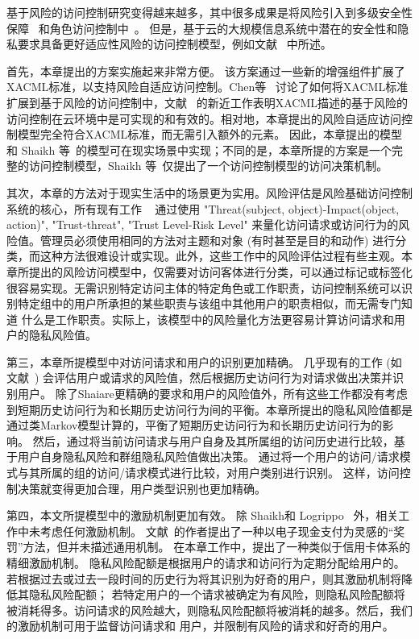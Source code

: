 基于风险的访问控制研究变得越来越多，其中很多成果是将风险引入到多级安全性保障~\cite{cheng2007fuzzy,ni2010risk} 和角色访问控制中~\cite{chen2011risk,choi2015framework}。 但是，基于云的大规模信息系统中潜在的安全性和隐私要求具备更好适应性风险的访问控制模型，例如文献~\cite{wang2011quantified,shaikh2012dynamic,khambhammettu2013framework} 中所述。

首先，本章提出的方案实施起来非常方便。 该方案通过一些新的增强组件扩展了XACML标准，以支持风险自适应访问控制。Chen等~\cite{chen2013xacml} 讨论了如何将XACML标准扩展到基于风险的访问控制中，文献~\cite{santos2014dynamic} 的新近工作表明XACML描述的基于风险的访问控制在云环境中是可实现的和有效的。相对地，本章提出的风险自适应访问控制模型完全符合XACML标准，而无需引入额外的元素。 因此，本章提出的模型和 Shaikh 等~\cite{shaikh2012dynamic}的模型可在现实场景中实现；不同的是，本章所提的方案是一个完整的访问控制模型，Shaikh 等~\cite{shaikh2012dynamic}仅提出了一个访问控制模型的访问决策机制。

其次，本章的方法对于现实生活中的场景更为实用。风险评估是风险基础访问控制系统的核心，所有现有工作 ~\cite{wang2011quantified, shaikh2012dynamic, khambhammettu2013framework} 通过使用 "Threat(subject, object)-Impact(object, action)", "Trust-threat", "Trust Level-Risk Level" 来量化访问请求或访问行为的风险值。管理员必须使用相同的方法对主题和对象 (有时甚至是目的和动作) 进行分类，而这种方法很难设计或实现。此外，这些工作中的风险评估过程有些主观。本章所提出的风险访问模型中，仅需要对访问客体进行分类，可以通过标记或标签化很容易实现。无需识别特定访问主体的特定角色或工作职责，访问控制系统可以识别特定组中的用户所承担的某些职责与该组中其他用户的职责相似，而无需专门知道 什么是工作职责。实际上，该模型中的风险量化方法更容易计算访问请求和用户的隐私风险值。

第三，本章所提模型中对访问请求和用户的识别更加精确。 几乎现有的工作 (如文献~\cite{wang2011quantified,shaikh2012dynamic}) 会评估用户或请求的风险值，然后根据历史访问行为对请求做出决策并识别用户。 除了Shaiare更精确的要求和用户的风险值外，所有这些工作都没有考虑到短期历史访问行为和长期历史访问行为间的平衡。本章所提出的隐私风险值都是通过类Markov模型计算的，平衡了短期历史访问行为和长期历史访问行为的影响。 然后，通过将当前访问请求与用户自身及其所属组的访问历史进行比较，基于用户自身隐私风险和群组隐私风险值做出决策。 通过将一个用户的访问/请求模式与其所属的组的访问/请求模式进行比较，对用户类别进行识别。 这样，访问控制决策就变得更加合理，用户类型识别也更加精确。

第四，本文所提模型中的激励机制更加有效。 除 Shaikh和 Logrippo ~\cite{shaikh2012dynamic}外，相关工作中未考虑任何激励机制。 文献~\cite{shaikh2012dynamic}的作者提出了一种以电子现金支付为灵感的“奖罚”方法，但并未描述通用机制。 在本章工作中，提出了一种类似于信用卡体系的精细激励机制。 隐私风险配额是根据用户的请求和访问行为定期分配给用户的。 若根据过去或过去一段时间的历史行为将其识别为好奇的用户，则其激励机制将降低其隐私风险配额； 若特定用户的一个请求被确定为有风险，则隐私风险配额将被消耗得多。访问请求的风险越大，则隐私风险配额将被消耗的越多。然后，我们的激励机制可用于监督访问请求和 用户，并限制有风险的请求和好奇的用户。

